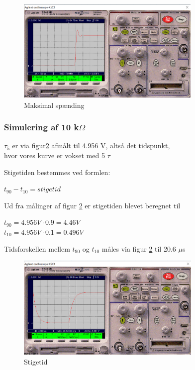 \begin{figure}[h]
 \begin{center}
  \includegraphics[height=5cm]{P_Fig/figur9_1k_max}
  \caption{Maksimal spænding}
  \label{1k_max}
 \end{center}
\end{figure}

\subsubsection{Simulering af 10 k$\Omega$ }
$\tau_5$ er via figur\ref{10k.stigetid} afmålt til 4.956 V, altså det tidspunkt, \\ hvor vores kurve er vokset med 5 $\tau$

Stigetiden bestemmes ved formlen:
\begin{center}
$t_{90} - t_{10} = stigetid$
\end{center}

Ud fra målinger af figur \ref{10k.stigetid} er stigetiden blevet beregnet til

\begin{center}
$t_{90} = 4.956 V \cdot 0.9 = 4.46 V$
\\ 
$t_{10} = 4.956 V \cdot 0.1 = 0.496 V$
\end{center}

Tidsforskellen mellem $t_{90}$ og $t_{10}$ måles via figur \ref{10k.stigetid} til 20.6 $\mu$s

\begin{figure}[h]
 \begin{center}
  \includegraphics[height=5cm]{P_Fig/figur10_10k_stigetid}
  \caption{Stigetid}
  \label{10k.stigetid}
 \end{center}
\end{figure}

